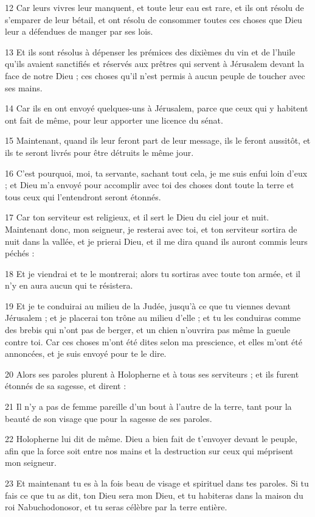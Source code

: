 \par 12 Car leurs vivres leur manquent, et toute leur eau est rare, et ils ont résolu de s'emparer de leur bétail, et ont résolu de consommer toutes ces choses que Dieu leur a défendues de manger par ses lois.
\par 13 Et ils sont résolus à dépenser les prémices des dixièmes du vin et de l'huile qu'ils avaient sanctifiés et réservés aux prêtres qui servent à Jérusalem devant la face de notre Dieu ; ces choses qu'il n'est permis à aucun peuple de toucher avec ses mains.
\par 14 Car ils en ont envoyé quelques-uns à Jérusalem, parce que ceux qui y habitent ont fait de même, pour leur apporter une licence du sénat.
\par 15 Maintenant, quand ils leur feront part de leur message, ils le feront aussitôt, et ils te seront livrés pour être détruits le même jour.
\par 16 C'est pourquoi, moi, ta servante, sachant tout cela, je me suis enfui loin d'eux ; et Dieu m'a envoyé pour accomplir avec toi des choses dont toute la terre et tous ceux qui l'entendront seront étonnés.
\par 17 Car ton serviteur est religieux, et il sert le Dieu du ciel jour et nuit. Maintenant donc, mon seigneur, je resterai avec toi, et ton serviteur sortira de nuit dans la vallée, et je prierai Dieu, et il me dira quand ils auront commis leurs péchés :
\par 18 Et je viendrai et te le montrerai; alors tu sortiras avec toute ton armée, et il n'y en aura aucun qui te résistera.
\par 19 Et je te conduirai au milieu de la Judée, jusqu'à ce que tu viennes devant Jérusalem ; et je placerai ton trône au milieu d'elle ; et tu les conduiras comme des brebis qui n'ont pas de berger, et un chien n'ouvrira pas même la gueule contre toi. Car ces choses m'ont été dites selon ma prescience, et elles m'ont été annoncées, et je suis envoyé pour te le dire.
\par 20 Alors ses paroles plurent à Holopherne et à tous ses serviteurs ; et ils furent étonnés de sa sagesse, et dirent :
\par 21 Il n'y a pas de femme pareille d'un bout à l'autre de la terre, tant pour la beauté de son visage que pour la sagesse de ses paroles.
\par 22 Holopherne lui dit de même. Dieu a bien fait de t'envoyer devant le peuple, afin que la force soit entre nos mains et la destruction sur ceux qui méprisent mon seigneur.
\par 23 Et maintenant tu es à la fois beau de visage et spirituel dans tes paroles. Si tu fais ce que tu as dit, ton Dieu sera mon Dieu, et tu habiteras dans la maison du roi Nabuchodonosor, et tu seras célèbre par la terre entière.

